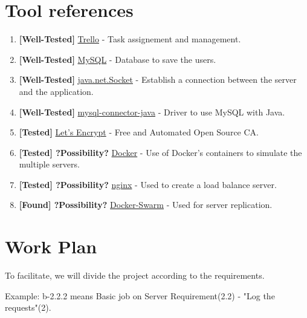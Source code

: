 \documentclass[a4paper,titlepage,11pt]{article}
\begin{document}
\section{Tool references}
\begin{enumerate}
  \item \textbf{[Well-Tested]} \href{https://trello.com/}{Trello} - Task assignement and management.
  \item \textbf{[Well-Tested]} \href{https://www.mysql.com}{MySQL} - Database to save the users.
  \item \textbf{[Well-Tested]} \href{https://docs.oracle.com/javase/7/docs/api/java/net/Socket.html}{java.net.Socket} - Establish a connection between the server and the application.
  \item \textbf{[Well-Tested]} \href{http://dev.mysql.com/downloads/connector/j/}{mysql-connector-java} - Driver to use MySQL with Java.
  \item \textbf{[Tested]} \href{https://letsencrypt.org}{Let's Encrypt} - Free and Automated Open Source CA.
  \item \textbf{[Tested] ?Possibility?} \href{https://www.docker.com}{Docker} - Use of Docker's containers to simulate the multiple servers.
  \item \textbf{[Tested] ?Possibility?} \href{https://www.nginx.com}{nginx} - Used to create a load balance server.
  \item \textbf{[Found] ?Possibility?} \href{https://docs.docker.com/swarm/overview/}{Docker-Swarm} - Used for server replication.
\end{enumerate}

\section{Work Plan}
To facilitate, we will divide the project according to the requirements.

Example: b-2.2.2 means Basic job on Server Requirement(2.2) - "Log the requests"(2).
\end{document}
